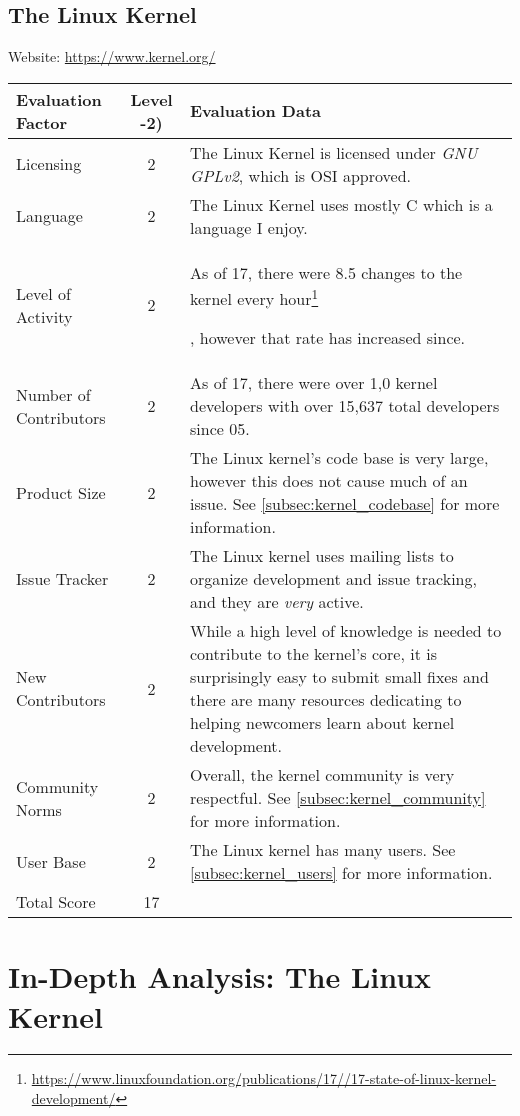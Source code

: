 \documentclass[11pt]{article}
\begin{document}
\subsection{The Linux Kernel}
\nopagebreak
Website: \url{https://www.kernel.org/}
\nopagebreak
\begin{center}
\begin{tabularx}{\textwidth}{|l|c|X|}
	\hline
	\textbf{Evaluation Factor} & \textbf{Level -2)} & \textbf{Evaluation Data} \\\hline
	Licensing & 2 & The Linux Kernel is licensed under \textit{GNU GPLv2}, which is OSI approved.\\\hline
	Language & 2 & The Linux Kernel uses mostly C which is a language I enjoy.\\\hline
	Level of Activity & 2 & As of 17, there were 8.5 changes to the kernel every hour\footnote{\url{https://www.linuxfoundation.org/publications/17//17-state-of-linux-kernel-development/}}\addtocounter{footnote}{-1}\addtocounter{Hfootnote}{-1}, however that rate has increased since.\\\hline
	Number of Contributors & 2 & As of 17, there were over 1,0 kernel developers with over 15,637 total developers since 05.\footnotemark\\\hline
	Product Size & 2 & The Linux kernel's code base is very large, however this does not cause much of an issue.  See \ref{subsec:kernel_codebase} for more information.\\\hline
	Issue Tracker & 2 & The Linux kernel uses mailing lists to organize development and issue tracking, and they are \textit{very} active.\\\hline
	New Contributors & 2 & While a high level of knowledge is needed to contribute to the kernel's core, it is surprisingly easy to submit small fixes and there are many resources dedicating to helping newcomers learn about kernel development.\\\hline
	Community Norms & 2 & Overall, the kernel community is very respectful.  See \ref{subsec:kernel_community} for more information.\\\hline
	User Base & 2 & The Linux kernel has many users.  See \ref{subsec:kernel_users} for more information.\\\hline
	Total Score & 17 & \\\hline
\end{tabularx}
\end{center}

\section{In-Depth Analysis: The Linux Kernel}
\end{document}

